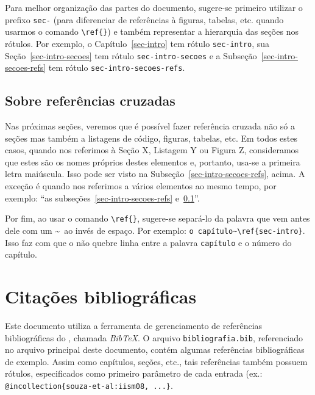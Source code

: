 Para melhor organização das partes do documento, sugere-se primeiro utilizar o prefixo \texttt{sec-} (para diferenciar de referências à figuras, tabelas, etc. quando usarmos o comando \texttt{\textbackslash ref\{\}}) e também representar a hierarquia das seções nos rótulos. Por exemplo, o Capítulo~\ref{sec-intro} tem rótulo \texttt{sec-intro}, sua Seção~\ref{sec-intro-secoes} tem rótulo \texttt{sec-intro-secoes} e a Subseção~\ref{sec-intro-secoes-refs} tem rótulo \texttt{sec-intro-secoes-refs}.



\subsection{Sobre referências cruzadas}
\label{sec-intro-secoes-sobrerefs}

Nas próximas seções, veremos que é possível fazer referência cruzada não só a seções mas também a listagens de código, figuras, tabelas, etc. Em todos estes casos, quando nos referimos à Seção X, Listagem Y ou Figura Z, consideramos que estes são os nomes próprios destes elementos e, portanto, usa-se a primeira letra maiúscula. Isso pode ser visto na Subseção~\ref{sec-intro-secoes-refs}, acima. A exceção é quando nos referimos a vários elementos ao mesmo tempo, por exemplo: ``as subseções~\ref{sec-intro-secoes-refs} e~\ref{sec-intro-secoes-sobrerefs}''.

Por fim, ao usar o comando \texttt{\textbackslash ref\{\}}, sugere-se separá-lo da palavra que vem antes dele com um \textasciitilde\ ao invés de espaço. Por exemplo: \texttt{o capítulo\textasciitilde \textbackslash ref\{sec-intro\}}. Isso faz com que o \latex não quebre linha entre a palavra \texttt{capítulo} e o número do capítulo.




\section{Citações bibliográficas}
\label{sec-intro-citacoes}

Este documento utiliza a ferramenta de gerenciamento de referências bibliográficas do \latex, chamada \emph{BibTeX}. O arquivo \texttt{bibliografia.bib}, referenciado no arquivo \latex principal deste documento, contém algumas referências bibliográficas de exemplo. Assim como capítulos, seções, etc., tais referências também possuem rótulos, especificados como primeiro parâmetro de cada entrada (ex.: \texttt{@incollection\{souza-et-al:iism08, ...\}}.

